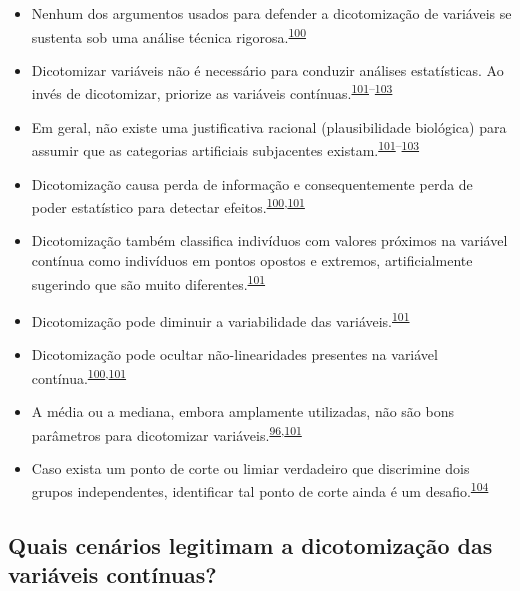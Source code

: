 \documentclass[
  a4paper,
]{book}
\begin{document}
\begin{itemize}
\item
  Nenhum dos argumentos usados para defender a dicotomização de variáveis se sustenta sob uma análise técnica rigorosa.\textsuperscript{\protect\hyperlink{ref-MacCallum2002}{100}}
\item
  Dicotomizar variáveis não é necessário para conduzir análises estatísticas. Ao invés de dicotomizar, priorize as variáveis contínuas.\textsuperscript{\protect\hyperlink{ref-Altman2006}{101}--\protect\hyperlink{ref-Collins2016}{103}}
\item
  Em geral, não existe uma justificativa racional (plausibilidade biológica) para assumir que as categorias artificiais subjacentes existam.\textsuperscript{\protect\hyperlink{ref-Altman2006}{101}--\protect\hyperlink{ref-Collins2016}{103}}
\item
  Dicotomização causa perda de informação e consequentemente perda de poder estatístico para detectar efeitos.\textsuperscript{\protect\hyperlink{ref-MacCallum2002}{100},\protect\hyperlink{ref-Altman2006}{101}}
\item
  Dicotomização também classifica indivíduos com valores próximos na variável contínua como indivíduos em pontos opostos e extremos, artificialmente sugerindo que são muito diferentes.\textsuperscript{\protect\hyperlink{ref-Altman2006}{101}}
\item
  Dicotomização pode diminuir a variabilidade das variáveis.\textsuperscript{\protect\hyperlink{ref-Altman2006}{101}}
\item
  Dicotomização pode ocultar não-linearidades presentes na variável contínua.\textsuperscript{\protect\hyperlink{ref-MacCallum2002}{100},\protect\hyperlink{ref-Altman2006}{101}}
\item
  A média ou a mediana, embora amplamente utilizadas, não são bons parâmetros para dicotomizar variáveis.\textsuperscript{\protect\hyperlink{ref-Fedorov2009}{96},\protect\hyperlink{ref-Altman2006}{101}}
\item
  Caso exista um ponto de corte ou limiar verdadeiro que discrimine dois grupos independentes, identificar tal ponto de corte ainda é um desafio.\textsuperscript{\protect\hyperlink{ref-Prince2017}{104}}
\end{itemize}

\hypertarget{quais-cenuxe1rios-legitimam-a-dicotomizauxe7uxe3o-das-variuxe1veis-contuxednuas}{%
\subsection{Quais cenários legitimam a dicotomização das variáveis contínuas?}\label{quais-cenuxe1rios-legitimam-a-dicotomizauxe7uxe3o-das-variuxe1veis-contuxednuas}}
\end{document}
